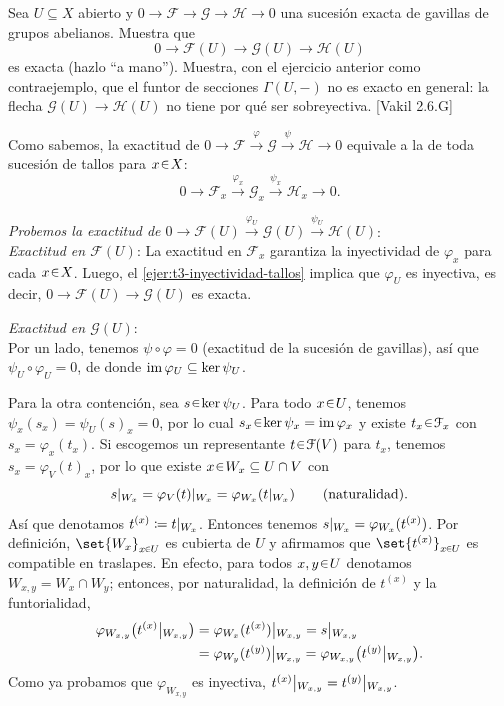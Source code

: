 \begin{ejer}\label{ejer:t3-secciones-exacto-izquierda}
Sea $U\subseteq X$ abierto y $0\to\mathcal F\to\mathcal G\to\mathcal H\to0$ una sucesión exacta de gavillas de grupos abelianos. Muestra que
\[
0\longrightarrow\mathcal F(U)\longrightarrow\mathcal G(U)\longrightarrow\mathcal H(U)
\]
es exacta (hazlo ``a mano''). Muestra, con el ejercicio anterior como contraejemplo, que el funtor de secciones $\Gamma(U,-)$ no es exacto en general: la flecha $\mathcal G(U)\to\mathcal H(U)$ no tiene por qué ser sobreyectiva. \hfill [Vakil 2.6.G]
\end{ejer}
\begin{sol}
Como sabemos, la exactitud de $0\to\mathcal F\xrightarrow{\varphi}\mathcal G\xrightarrow{\psi}\mathcal H\to0$ equivale a la de toda sucesión de tallos para $x\en X$:
\[
0\longrightarrow\mathcal F_x\xrightarrow{\varphi_x}\mathcal G_x\xrightarrow{\psi_x}\mathcal H_x\longrightarrow0.
\]

\medskip
\noindent\emph{Probemos la exactitud de $0\to\mathcal F(U)\xrightarrow{\varphi_U}\mathcal G(U)\xrightarrow{\psi_U}\mathcal H(U)$}:\\
\emph{Exactitud en $\mathcal F(U)$}: La exactitud en $\mathcal F_x$ garantiza la inyectividad de $\varphi_x$ para cada $x\en X$. Luego, el \cref{ejer:t3-inyectividad-tallos} implica que $\varphi_U$ es inyectiva, es decir, $0\to\mathcal F(U)\to\mathcal G(U)$ es exacta.

\medskip
\noindent\emph{Exactitud en $\mathcal G(U)$}:\\
Por un lado, tenemos $\psi\circ\varphi=0$ (exactitud de la sucesión de gavillas), así que $\psi_U\circ\varphi_U=0$, de donde $\operatorname{im}\varphi_U\subseteq\ker\psi_U$.

Para la otra contención, sea $s\en\ker\psi_U$. Para todo $x\en U$, tenemos $\psi_x(s_x)=\psi_U(s)_x=0$, por lo cual $s_x\en\ker\psi_x=\im\varphi_x$ y existe $t_x\en\mathcal F_x$ con $s_x=\varphi_x(t_x)$. Si escogemos un representante $t\en\mathcal F(V)$ para $t_x$, tenemos $s_x=\varphi_V(t)_x$, por lo que existe $x\en W_x\subseteq U\cap V$ con
\[
\restr{s}{W_x}=\restr{\varphi_V(t)}{W_x}
=\varphi_{W_x}(\restr{t}{W_x})\qquad\text{(naturalidad)}.
\]
Así que denotamos $t^{(x)}\coloneq\restr{t}{W_x}$. Entonces tenemos $\restr{s}{W_x}=\varphi_{W_x}(t^{(x)})$. Por definición, $\set{W_x}_{x\en U}$ es cubierta de $U$ y afirmamos que $\set{t^{(x)}}_{x\en U}$ es compatible en traslapes. En efecto, para todos $x,y\en U$ denotamos $W_{x,y}=W_x\cap W_y$; entonces, por naturalidad, la definición de $t^{(x)}$ y la funtorialidad,
\[
\begin{aligned}
\varphi_{W_{x,y}}\bigl(\restr{t^{(x)}}{W_{x,y}}\bigr)
&=\restr{\varphi_{W_x}(t^{(x)})}{W_{x,y}}
=\restr{s}{W_{x,y}}\\
&=\restr{\varphi_{W_y}(t^{(y)})}{W_{x,y}}
=\varphi_{W_{x,y}}\bigl(\restr{t^{(y)}}{W_{x,y}}\bigr).
\end{aligned}
\]
Como ya probamos que $\varphi_{W_{x,y}}$ es inyectiva, $\restr{t^{(x)}}{W_{x,y}}=\restr{t^{(y)}}{W_{x,y}}$.


\end{sol}
